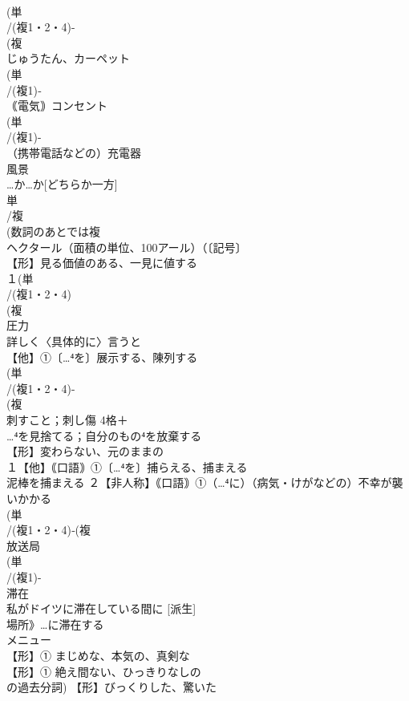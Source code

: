 \documentclass[8pt]{extreport}
\begin{document}
\begin{CJK}{UTF8}{min}
\\	(単
\\	/(複1・2・4)-
\\	(複
\\	じゅうたん、カーペット
\\	(単
\\	/(複1)‐
\\	｟電気｠コンセント 
\\	(単
\\	/(複1)-
\\	（携帯電話などの）充電器 
\\	風景
\\	…か…か[どちらか一方] 
\\	単
\\	/複
\\	(数詞のあとでは複
\\	ヘクタール（面積の単位、100アール）（〔記号〕
\\	【形】見る価値のある、一見に値する 
\\	１(単
\\	/(複1・2・4)
\\	(複
\\	圧力 
\\	詳しく〈具体的に〉言うと
\\	【他】①〔…⁴を〕展示する、陳列する 
\\	(単
\\	/(複1・2・4)-
\\	(複
\\	刺すこと；刺し傷 4格＋
\\	…⁴を見捨てる；自分のもの⁴を放棄する
\\	【形】変わらない、元のままの 
\\	１【他】｟口語｠①〔…⁴を〕捕らえる、捕まえる 
\\	泥棒を捕まえる ２【非人称】｟口語｠①（…⁴に）（病気・けがなどの）不幸が襲いかかる 
\\	(単
\\	/(複1・2・4)‐(複
\\	放送局
\\	(単
\\	/(複1)-
\\	滞在 
\\	私がドイツに滞在している間に [派生] 
\\	場所》…に滞在する
\\	メニュー
\\	【形】① まじめな、本気の、真剣な 
\\	【形】① 絶え間ない、ひっきりなしの
\\	の過去分詞) 【形】びっくりした、驚いた 

\end{CJK}
\end{document}
